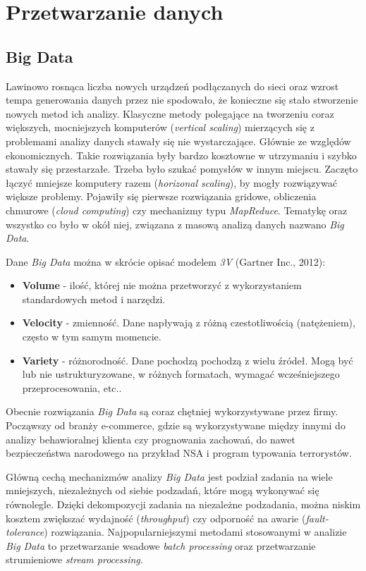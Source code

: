 \section{Przetwarzanie danych}
\subsection{Big Data}
Lawinowo rosnąca liczba nowych urządzeń podłączanych do sieci
oraz wzrost tempa generowania danych przez nie spodowało,
że konieczne się stało stworzenie nowych metod ich analizy.
Klasyczne metody polegające na tworzeniu coraz większych,
mocniejszych komputerów (\textit{vertical scaling})
mierzących się z problemami analizy danych stawały się nie wystarczające.
Głównie ze względów ekonomicznych.
Takie rozwiązania były bardzo kosztowne w utrzymaniu i szybko stawały się przestarzałe.
Trzeba było szukać pomysłów w innym miejscu.
Zaczęto łączyć mniejsze komputery razem (\textit{horizonal scaling}),
by mogły rozwiązywać większe problemy.
Pojawiły się pierwsze rozwiązania gridowe,
obliczenia chmurowe (\textit{cloud computing})
czy mechanizmy typu \textit{MapReduce}.
Tematykę oraz wszystko co było w okół niej,
związana z masową analizą danych nazwano \textit{Big Data}.

Dane \textit{Big Data} można w skrócie opisać modelem \textit{3V} (Gartner Inc., 2012):
\begin{itemize}
		\item \textbf{Volume} - ilość,
		której nie można przetworzyć z wykorzystaniem standardowych metod i narzędzi.
		\item \textbf{Velocity} - zmienność.
		Dane napływają z różną czestotliwością (natężeniem),
		często w tym samym momencie.
		\item \textbf{Variety} - różnorodność.
		Dane pochodzą pochodzą z wielu źródeł.
		Mogą być lub nie ustrukturyzowane,
		w różnych formatach,
		wymagać wcześniejszego przeprocesowania,
		etc..
\end{itemize}

Obecnie rozwiązania \textit{Big Data} są coraz chętniej wykorzystywane przez firmy.
Począwszy od branży e-commerce,
gdzie są wykorzystywane między innymi do analizy behawioralnej klienta czy prognowania zachowań,
do nawet bezpieczeństwa narodowego
na przykład NSA i program typowania terrorystów.

Główną cechą mechanizmów analizy \textit{Big Data} jest podział zadania
na wiele mniejszych,
niezależnych od siebie podzadań,
które mogą wykonywać się równolegle.
Dzięki dekompozycji zadania na niezależne podzadania,
można niskim kosztem zwiększać wydajność (\textit{throughput})
czy odporność na awarie (\textit{fault-tolerance}) rozwiązania.
Najpopularniejszymi metodami stosowanymi w analizie \textit{Big Data} to
przetwarzanie wsadowe \textit{batch processing}
oraz przetwarzanie strumieniowe \textit{stream processing}.

